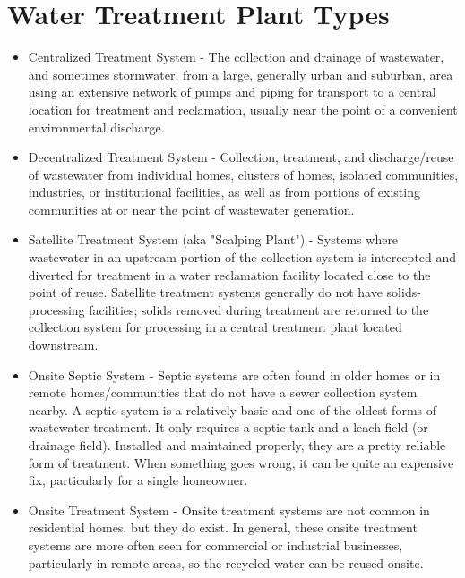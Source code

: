 \section{Water Treatment Plant Types} 
\begin{itemize}
\item Centralized Treatment System - The collection and drainage of wastewater, and sometimes stormwater, from a large, generally urban and suburban, area using an extensive network of pumps and piping for transport to a central location for treatment and reclamation, usually near the point of a convenient environmental discharge.

\item Decentralized Treatment System - Collection, treatment, and discharge/reuse of wastewater from individual homes, clusters of homes, isolated communities, industries, or institutional facilities, as well as from portions of existing communities at or near the point of wastewater generation.

\item Satellite Treatment System (aka "Scalping Plant") - Systems where wastewater in an upstream portion of the collection system is intercepted and diverted for treatment in a water reclamation facility located close to the point of reuse.  Satellite treatment systems generally do not have solids-processing facilities; solids removed during treatment are returned to the collection system for processing in a central treatment plant located downstream. 

\item Onsite Septic System - Septic systems are often found in older homes or in remote homes/communities that do not have a sewer collection system nearby.  A septic system is a relatively basic and one of the oldest forms of wastewater treatment.  It only requires a septic tank and a leach field (or drainage field).  Installed and maintained properly, they are a pretty reliable form of treatment.  When something goes wrong, it can be quite an expensive fix, particularly for a single homeowner.
\item Onsite Treatment System - Onsite treatment systems are not common in residential homes, but they do exist.  In general, these onsite treatment systems are more often seen for commercial or industrial businesses, particularly in remote areas, so the recycled water can be reused onsite.
\end{itemize}

